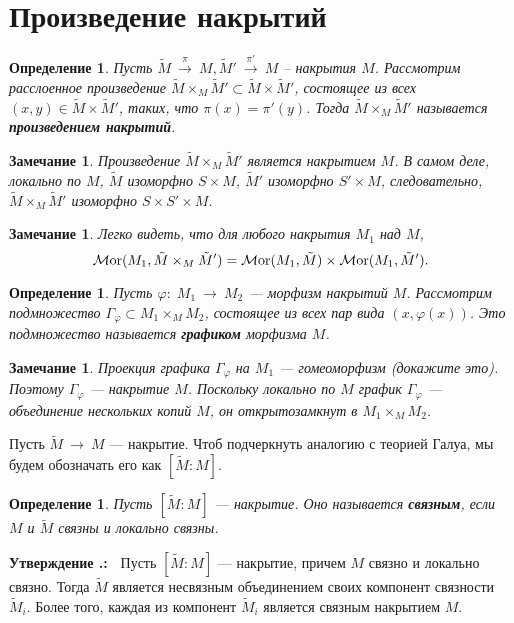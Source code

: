 \documentclass[12pt]{book}
\newcommand{\arrow}{{\:\longrightarrow\:}}
\renewcommand{\phi}{\varphi}
\newcommand{\Mor}{\operatorname{{\cal M}or}}
\theoremstyle{upshape}
\newtheorem{zadacha}{Задача}[chapter]
\theoremstyle{generic}
\newtheorem{opredelenie}[teorema]{Определение}
\newtheorem{remark}[teorema]{Замечание}
\def\замечание{\begin{remark}}
\def\еза{\end{remark}}
\theoremstyle{upshapenonumber}
\newtheorem{ukazanie}{Указание}[section]
\newcommand{\следствие}{%
     \refstepcounter{teorema}
     {\noindent\bf Следствие \thechapter.\arabic{teorema}:\ }}
\newcommand{\пример}{%
     \refstepcounter{teorema}
     {\noindent\bf Пример \thechapter.\arabic{teorema}:\ }}
\newcommand{\лемма}{%
     \refstepcounter{teorema}
     {\noindent\bf Лемма \thechapter.\arabic{teorema}:\ }}
\newcommand{\теорема}{%
     \refstepcounter{teorema}
     {\noindent\bf Теорема \thechapter.\arabic{teorema}:\ }}
\newcommand{\утверждение}{%
     \refstepcounter{teorema}
     {\noindent\bf Утверждение \thechapter.\arabic{teorema}:\ }}
\def\хфилл{\hfill}
\def\бф{\bf}
\def\ем{\em}
\def\задача{\begin{zadacha}}
\def\ез{\end{zadacha}}
\def\указание{\begin{ukazanie}}
\def\еу{\end{ukazanie}}
\def\определение{\begin{opredelenie}}
\def\ео{\end{opredelenie}}
\def\енум{\begin{enumerate}}
\def\ее{\end{enumerate}}
\begin{document}

\section{Произведение накрытий}


\определение
Пусть $\tilde M\stackrel {\pi} \arrow M, \tilde M'\stackrel {\pi'} \arrow M$ 
-- накрытия $M$. Рассмотрим расслоенное произведение
$\tilde M \times_M \tilde M'\subset \tilde M \times \tilde M'$, состоящее
из всех $(x,y)\in \tilde M \times \tilde M'$, таких,
что $\pi(x) = \pi'(y)$. Тогда $\tilde M \times_M \tilde M'$
называется {\бф произведением накрытий}.
\ео

\замечание 
Произведение
$\tilde M \times_M \tilde M'$ является накрытием $M$.
В самом деле, локально по $M$, $\tilde M$ изоморфно
$S\times M$, $\tilde M'$ изоморфно $S' \times M$,
следовательно, $\tilde M \times_M \tilde M'$ изоморфно
$S\times S' \times M$.
\еза 

\замечание 
Легко видеть, что для любого накрытия $M_1$ над $M$,
\[ 
\Mor(M_1, \tilde M \times_M \tilde M')= \Mor(M_1, \tilde M)
 \times \Mor(M_1, \tilde M').
\]
\еза

\определение
Пусть $\phi:\; M_1\arrow M_2$ --- морфизм накрытий $M$.
Рассмотрим подмножество $\Gamma_\phi \subset M_1\times_M M_2$,
состоящее из всех пар вида $(x, \phi(x))$.
Это подмножество называется {\бф графиком} морфизма $M$.
\ео

\замечание
Проекция графика $\Gamma_\phi$ на $M_1$ --- гомеоморфизм
(докажите это). Поэтому $\Gamma_\phi$ --- накрытие $M$.
Поскольку локально по $M$ график $\Gamma_\phi$ --- объединение
нескольких копий $M$, он открытозамкнут в $M_1\times_M M_2$.
\еза


Пусть $\tilde M \arrow M$ --- накрытие.
Чтоб подчеркнуть аналогию с теорией Галуа,
мы будем обозначать его как $[\tilde M: M]$.

\определение
Пусть $[\tilde M: M]$ --- накрытие.
Оно называется {\бф связным}, если 
$M$ и $\tilde M$ связны и локально связны.
\ео

\утверждение
Пусть $[\tilde M: M]$ --- накрытие, причем
$M$ связно и локально связно. Тогда 
$\tilde M$ является несвязным объединением
своих компонент связности $\tilde M_i$. 
Более того, каждая из компонент $\tilde M_i$
является связным накрытием $M$.

\хфилл
\end{document}
